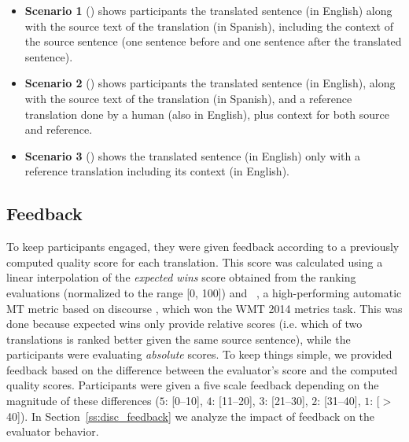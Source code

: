 \begin{itemize}
  \item {\bf{Scenario 1}} (\src) shows participants the translated sentence (in English) along with the source text of the translation (in Spanish), including the context of the source sentence (one sentence before and one sentence after the translated sentence). 
  \item {\bf{Scenario 2}} (\srctgt) shows participants the translated sentence (in English), along with the source text of the translation (in Spanish), and a reference translation done by a human (also in English), plus context for both source and reference.  
  \item {\bf{Scenario 3}} (\tgt) shows the translated sentence (in English) only with a reference translation including its context (in English). 
\end{itemize} 


\subsection{Feedback}
To keep participants engaged, they were given feedback according to a previously computed quality score for each translation.  This score was calculated using a linear interpolation of the \emph{expected wins} score obtained from the ranking evaluations (normalized to the range [0, 100]) and \discoparty~\cite{discoMT:WMT2014}, a high-performing automatic MT metric based on discourse \cite{discoMT:acl2014}, which won the WMT 2014 metrics task. This was done because expected wins only provide relative scores (i.e. which of two translations is ranked better given the same source sentence), while the participants were evaluating \emph{absolute} scores.
To keep things simple, we provided feedback based on the difference between the evaluator's score and the computed quality scores. Participants were given a five scale feedback depending on the magnitude of these differences ($5$: [0--10], $4$: [11--20], $3$: [21--30], $2$: [31--40], $1$: [$>$40]). In Section~\ref{ss:disc_feedback} we analyze the impact of feedback on the evaluator behavior. %


